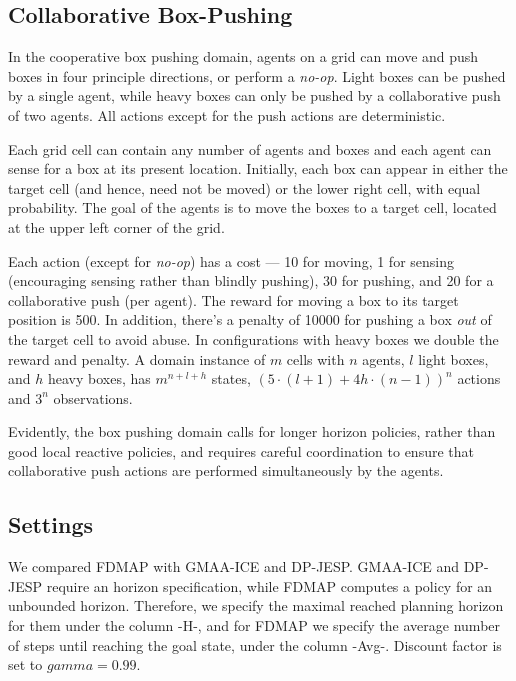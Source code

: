 \documentclass[letterpaper]{article} %
\theoremstyle{definition}
\newcommand{\eliran}[1]{\textbf{[\color{red}ELIRAN:#1]}}
\newcommand{\cbp}[0]{Collaborative Box-Pushing}
\begin{document}
\subsection{\cbp}

In the cooperative box pushing domain, agents on a grid can move and push boxes in  four principle directions, 
or perform a {\em no-op}. Light boxes can be pushed by a single agent, while heavy boxes can only be pushed by a collaborative push of two agents. 
All actions except for the push actions are deterministic.

Each grid cell can contain any number of agents and boxes and  each agent can sense for a box at its present location. %
Initially, each box can appear in either the target cell (and hence, need not be moved) or the lower right cell, with equal probability.
The goal of the agents is to move the boxes to a target cell, located at the upper left corner of the grid.
 


 


Each action (except for {\em no-op}) has a cost --- 10 for moving, 1 for sensing (encouraging sensing rather than blindly pushing), 30 for pushing, and 20 for a collaborative push (per agent). The reward for moving a box to its target position is 500. In addition, there's a penalty of 10000 for pushing a box \emph{out} of the target cell to avoid abuse. In configurations with heavy boxes we double the reward and penalty.
A domain instance of $m$ cells with $n$ agents, $l$ light boxes, and $h$ heavy boxes, has $m^{n+l+h}$ states, $(5\cdot(l+1)+4h\cdot(n-1))^n$ actions and $3^n$ observations.

Evidently, the box pushing domain calls for longer horizon policies, rather than good local reactive policies, and requires careful coordination to ensure that collaborative push actions are performed simultaneously by the agents.
 

\subsection{Settings} 

We compared FDMAP with GMAA-ICE and DP-JESP. GMAA-ICE and DP-JESP require an horizon specification, while FDMAP computes a policy for an unbounded horizon. Therefore, we specify the maximal reached planning horizon for them under the column -H-, and for FDMAP we specify the average number of steps until reaching the goal state, under the column -Avg-. Discount factor is set to $gamma=0.99$.
\end{document}
